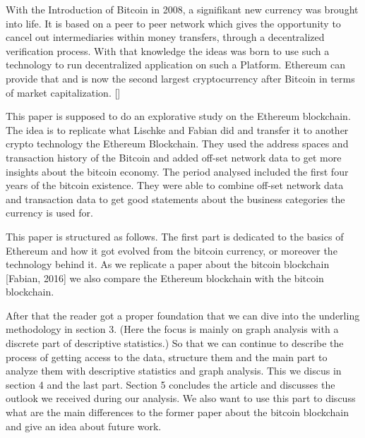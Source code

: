 With the Introduction of Bitcoin in 2008, a signifikant new currency was brought into life. It is based on a peer to peer network which gives the opportunity to cancel out intermediaries within money transfers, through a decentralized verification process. With that knowledge the ideas was born to use such a technology to run decentralized application on such a Platform. Ethereum can provide that and is now the second largest cryptocurrency after Bitcoin in terms of market capitalization. []

This paper is supposed to do an explorative study on the Ethereum blockchain. The idea is to replicate what Lischke and Fabian did and transfer it to another crypto technology the Ethereum Blockchain. They used the address spaces and transaction history of the Bitcoin and added off-set network data to get more insights about the bitcoin economy. The period analysed included the first four years of the bitcoin existence. They were able to combine off-set network data and transaction data to get good statements about the business categories the currency is used for.

This paper is structured as follows. The first part is dedicated to the basics of Ethereum and how it got evolved from the bitcoin currency, or moreover the technology behind it. As we replicate a paper about the bitcoin blockchain [Fabian, 2016] we also compare the Ethereum blockchain with the bitcoin blockchain. 

 After that the reader got a proper foundation that we can dive into the underling methodology in section 3. (Here the focus is mainly on graph analysis with a discrete part of descriptive statistics.) So that we can continue to describe the process of getting access to the data, structure them and the main part to analyze them with descriptive statistics and graph analysis. This we discus in section 4 and the last part. Section 5 concludes the article and discusses the outlook we received during our analysis. We also want to use this part to discuss what are the main differences to the former paper about the bitcoin blockchain and give an idea about future work. 
